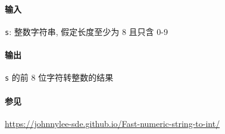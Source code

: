 \paragraph{输入}

\verb|s|: 整数字符串, 假定长度至少为 8 且只含 0-9

\paragraph{输出}

\verb|s| 的前 8 位字符转整数的结果

\paragraph{参见}

\url{https://johnnylee-sde.github.io/Fast-numeric-string-to-int/}
